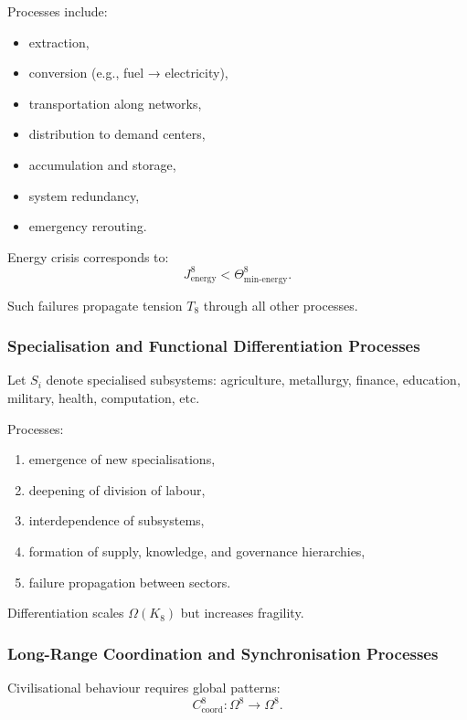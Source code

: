 Processes include:
\begin{itemize}
    \item extraction,
    \item conversion (e.g., fuel → electricity),
    \item transportation along networks,
    \item distribution to demand centers,
    \item accumulation and storage,
    \item system redundancy,
    \item emergency rerouting.
\end{itemize}

Energy crisis corresponds to:
\[
J^8_{\text{energy}} < \Theta^8_{\text{min-energy}}.
\]

Such failures propagate tension $T_8$ through all other processes.

\subsubsection{Specialisation and Functional Differentiation Processes}

Let $S_i$ denote specialised subsystems: agriculture, metallurgy, finance,
education, military, health, computation, etc.

Processes:
\begin{enumerate}
    \item emergence of new specialisations,
    \item deepening of division of labour,
    \item interdependence of subsystems,
    \item formation of supply, knowledge, and governance hierarchies,
    \item failure propagation between sectors.
\end{enumerate}

Differentiation scales $\Omega(K_8)$ but increases fragility.

\subsubsection{Long-Range Coordination and Synchronisation Processes}

Civilisational behaviour requires global patterns:
\[
C^8_{\text{coord}}: \Omega^8 \to \Omega^8.
\]


